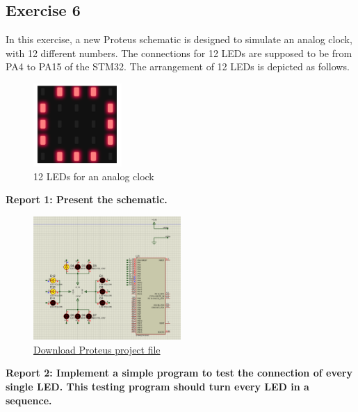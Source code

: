 \documentclass[twoside, final]{hcmut_report}
\begin{document}
\subsection{Exercise 6}
In this exercise, a new Proteus schematic is designed to simulate an analog clock, with 12 different numbers. The connections for 12 LEDs are supposed to be from PA4 to PA15 of the STM32. The arrangement of 12 LEDs is depicted as follows.

\begin{figure}[h!]
    \centering
    \includegraphics[width=0.3\textwidth]{graphics/f8.png}
    \caption{12 LEDs for an analog clock}
\end{figure}

\textbf{Report 1: Present the schematic.}
\begin{figure}[h!]
    \centering
    \includegraphics[width=0.5\textwidth]{graphics/f7.png}
    \caption{\href{https://github.com/batmaon512/Microcontroller-251/blob/main/Lab/Lab1_LED_Animations/Source_Proteus/EX5.pdsprj}{Download Proteus project file}}
\end{figure}

\textbf{Report 2: Implement a simple program to test the connection of every single LED. This testing program should turn every LED in a sequence.}
\end{document}
